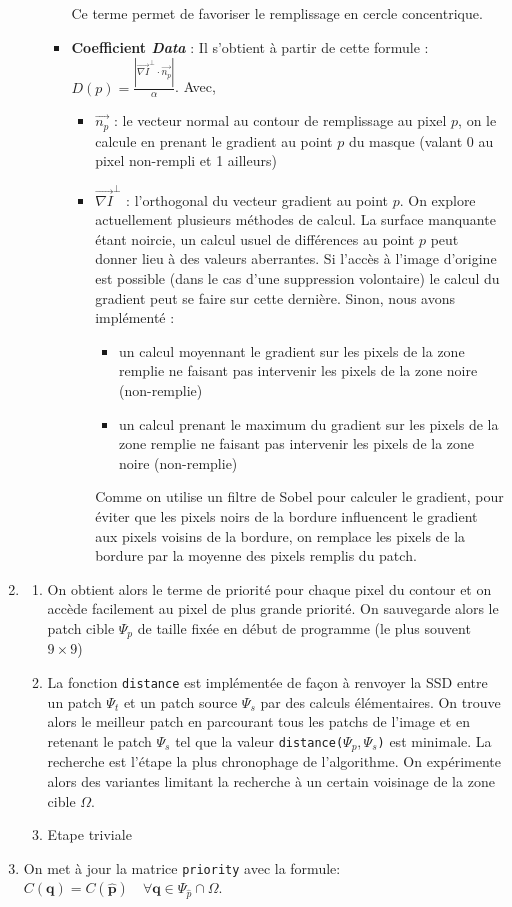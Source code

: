 \documentclass[9pt]{extarticle}
\begin{document}
\begin{enumerate}
\begin{enumerate}
\begin{itemize}
Ce terme permet de favoriser le remplissage en cercle concentrique.
\item \textbf{Coefficient \textit{Data}} : Il s'obtient à partir de cette formule : $D(p) = \frac{|\overrightarrow{\nabla I}^\perp \cdot \overrightarrow{n_p}|}{\alpha}$. Avec,
\begin{itemize}
\item  $\overrightarrow{n_p}$ : le vecteur normal au contour de remplissage au pixel $p$, on le calcule en prenant le gradient au point $p$ du masque (valant 0 au pixel non-rempli et 1 ailleurs)
\item $\overrightarrow{\nabla I}^\perp $ : l'orthogonal du vecteur gradient au point $p$. On explore actuellement plusieurs méthodes de calcul. La surface manquante étant noircie, un calcul usuel de différences au point $p$ peut donner lieu à des valeurs aberrantes. Si l'accès à l'image d'origine est possible (dans le cas d'une suppression volontaire) le calcul du gradient peut se faire sur cette dernière. Sinon, nous avons implémenté : \begin{itemize} \item un calcul moyennant le gradient sur les pixels de la zone remplie ne faisant pas intervenir les pixels de la zone noire (non-remplie) \item un calcul prenant le maximum du gradient sur les pixels de la zone remplie ne faisant pas intervenir les pixels de la zone noire (non-remplie)  \end{itemize}
Comme on utilise un filtre de Sobel pour calculer le gradient, pour éviter que les pixels noirs de la bordure influencent le gradient aux pixels voisins de la bordure, on remplace les pixels de la bordure par la moyenne des pixels remplis du patch. 
\end{itemize}
\end{itemize}
\end{enumerate}
\item \begin{enumerate}
\item On obtient alors le terme de priorité pour chaque pixel du contour et on accède facilement au pixel de plus grande priorité. On sauvegarde alors le patch cible $\Psi_p$ de taille fixée en début de programme (le plus souvent $9 \times 9$)
\item La fonction \verb+distance+ est implémentée de façon à renvoyer la SSD entre un patch $\Psi_t$ et un patch source $\Psi_s$ par des calculs élémentaires. On trouve alors le meilleur patch en parcourant tous les patchs de l'image et en retenant le patch $\Psi_s$ tel que la valeur \verb+distance(+$\Psi_p, \Psi_s$\verb+)+ est minimale. La recherche est l'étape la plus chronophage de l'algorithme. On expérimente alors des variantes limitant la recherche à un certain voisinage de la zone cible $\Omega$.
\item Etape triviale
\end{enumerate}
\item On met à jour la matrice \verb+priority+ avec la formule: $C(\mathbf{q}) = C(\hat{\mathbf{p}}) \quad \forall \mathbf{q} \in \Psi_{\hat{p}} \cap \Omega$.

\end{enumerate}
\end{document}
